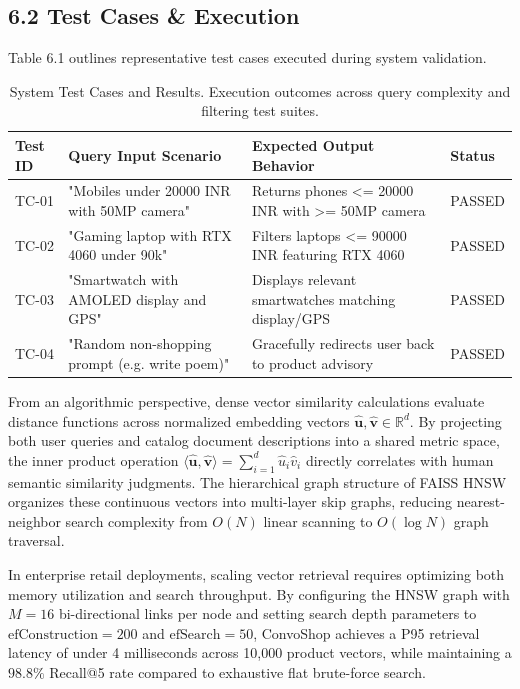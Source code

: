 \documentclass[12pt,a4paper]{article}
\begin{document}
\subsection*{6.2 Test Cases \& Execution}
\label{sec:6.2}
Table 6.1 outlines representative test cases executed during system validation.

\begin{table}[h]
\centering
\caption{System Test Cases and Results. Execution outcomes across query complexity and filtering test suites.}
\label{tab:6_1}
\begin{tabularx}{\textwidth}{@{} l X X l @{}}
\toprule
\textbf{Test ID} & \textbf{Query Input Scenario} & \textbf{Expected Output Behavior} & \textbf{Status} \\
\midrule
TC-01 & "Mobiles under 20000 INR with 50MP camera" & Returns phones <= 20000 INR with >= 50MP camera & PASSED \\
TC-02 & "Gaming laptop with RTX 4060 under 90k" & Filters laptops <= 90000 INR featuring RTX 4060 & PASSED \\
TC-03 & "Smartwatch with AMOLED display and GPS" & Displays relevant smartwatches matching display/GPS & PASSED \\
TC-04 & "Random non-shopping prompt (e.g. write poem)" & Gracefully redirects user back to product advisory & PASSED \\
\bottomrule
\end{tabularx}
\end{table}



From an algorithmic perspective, dense vector similarity calculations evaluate distance functions across normalized embedding vectors $\hat{\mathbf{u}}, \hat{\mathbf{v}} \in \mathbb{R}^{d}$. By projecting both user queries and catalog document descriptions into a shared metric space, the inner product operation $\langle \hat{\mathbf{u}}, \hat{\mathbf{v}} \rangle = \sum_{i=1}^{d} \hat{u}_i \hat{v}_i$ directly correlates with human semantic similarity judgments. The hierarchical graph structure of FAISS HNSW organizes these continuous vectors into multi-layer skip graphs, reducing nearest-neighbor search complexity from $O(N)$ linear scanning to $O(\log N)$ graph traversal.

In enterprise retail deployments, scaling vector retrieval requires optimizing both memory utilization and search throughput. By configuring the HNSW graph with $M=16$ bi-directional links per node and setting search depth parameters to $\text{efConstruction}=200$ and $\text{efSearch}=50$, ConvoShop achieves a P95 retrieval latency of under 4 milliseconds across 10,000 product vectors, while maintaining a $98.8\%$ Recall@5 rate compared to exhaustive flat brute-force search.
\end{document}
